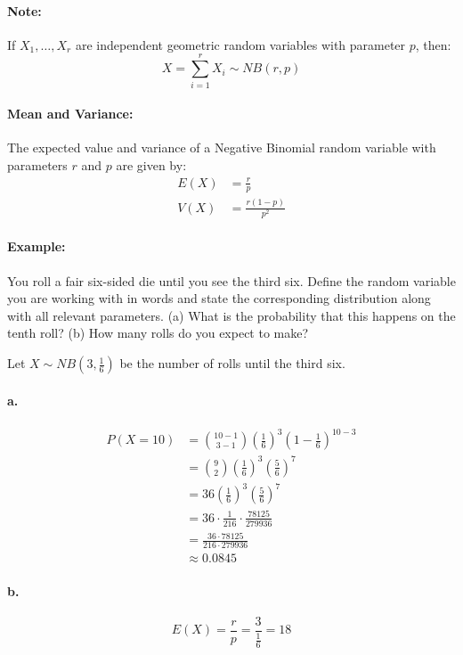 \paragraph*{Note:}
If $X_1, \dots, X_r$ are independent geometric random variables with parameter $p$, then:
\[
    X = \sum_{i=1}^{r} X_i \sim NB(r, p)
\]

\paragraph*{Mean and Variance:}
The expected value and variance of a Negative Binomial random variable with parameters $r$ and $p$ are given by:
\begin{align*}
    E(X) &= \frac{r}{p} \\
    V(X) &= \frac{r(1-p)}{p^2}
\end{align*}

\paragraph*{Example:}
You roll a fair six-sided die until you see the third six. Define the random variable you are working
with in words and state the corresponding distribution along with all relevant parameters. 
(a) What is the probability that this happens on the tenth roll?
(b) How many rolls do you expect to make?

Let $X \sim NB(3, \frac{1}{6})$ be the number of rolls until the third six.
\paragraph*{a.}
\begin{align*}
    P(X=10) &= \binom{10-1}{3-1} \left(\frac{1}{6}\right)^3 \left(1-\frac{1}{6}\right)^{10-3} \\
    &= \binom{9}{2} \left(\frac{1}{6}\right)^3 \left(\frac{5}{6}\right)^{7} \\
    &= 36 \left(\frac{1}{6}\right)^3 \left(\frac{5}{6}\right)^{7} \\
    &= 36 \cdot \frac{1}{216} \cdot \frac{78125}{279936} \\
    &= \frac{36 \cdot 78125}{216 \cdot 279936} \\
    &\approx 0.0845
\end{align*}
\paragraph*{b.}
\[
    E(X) = \frac{r}{p} = \frac{3}{\frac{1}{6}} = 18
\]

